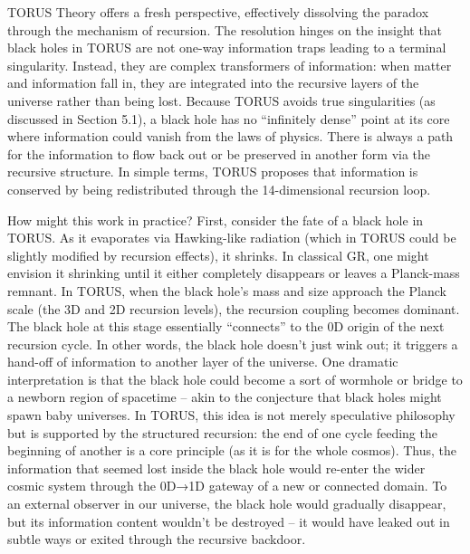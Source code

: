 \documentclass[]{article}
\begin{document}
TORUS Theory offers a fresh perspective, effectively dissolving the
paradox through the mechanism of recursion. The resolution hinges on the
insight that black holes in TORUS are not one-way information traps
leading to a terminal singularity. Instead, they are complex
transformers of information: when matter and information fall in, they
are integrated into the recursive layers of the universe rather than
being lost. Because TORUS avoids true singularities (as discussed in
Section 5.1), a black hole has no ``infinitely dense'' point at its core
where information could vanish from the laws of physics. There is always
a path for the information to flow back out or be preserved in another
form via the recursive structure. In simple terms, TORUS proposes that
information is conserved by being redistributed through the
14-dimensional recursion loop.

How might this work in practice? First, consider the fate of a black
hole in TORUS. As it evaporates via Hawking-like radiation (which in
TORUS could be slightly modified by recursion effects), it shrinks. In
classical GR, one might envision it shrinking until it either completely
disappears or leaves a Planck-mass remnant. In TORUS, when the black
hole's mass and size approach the Planck scale (the 3D and 2D recursion
levels), the recursion coupling becomes dominant. The black hole at this
stage essentially ``connects'' to the 0D origin of the next recursion
cycle. In other words, the black hole doesn't just wink out; it triggers
a hand-off of information to another layer of the universe. One dramatic
interpretation is that the black hole could become a sort of wormhole or
bridge to a newborn region of spacetime -- akin to the conjecture that
black holes might spawn baby universes. In TORUS, this idea is not
merely speculative philosophy but is supported by the structured
recursion: the end of one cycle feeding the beginning of another is a
core principle (as it is for the whole cosmos). Thus, the information
that seemed lost inside the black hole would re-enter the wider cosmic
system through the 0D→1D gateway of a new or connected domain. To an
external observer in our universe, the black hole would gradually
disappear, but its information content wouldn't be destroyed -- it would
have leaked out in subtle ways or exited through the recursive backdoor.
\end{document}
